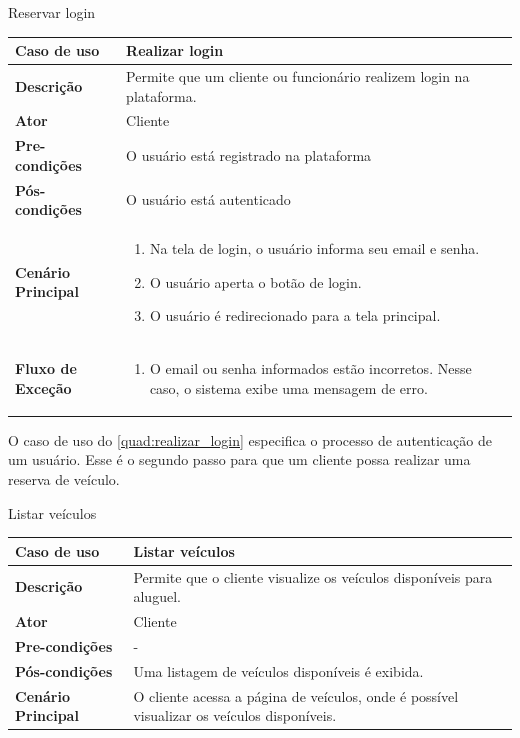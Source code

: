 \begin{quadro}[H]
    \centering
    \caption{Reservar login}
    \label{quad:realizar_login}
    \begin{tabular}{|p{1.2in}|p{3.5in}|}
    \hline
    
    \textbf{Caso de uso} & Realizar login\\ \hline
    \textbf{Descrição} & Permite que um cliente ou funcionário realizem login na plataforma. \\ \hline
    \textbf{Ator} & Cliente \\ \hline
    \textbf{Pre-condições} & O usuário está registrado na plataforma\\ \hline
    \textbf{Pós-condições} & O usuário está autenticado\\ \hline
    \textbf{Cenário Principal} & \begin{enumerate}
        \item Na tela de login, o usuário informa seu email e senha.
        \item O usuário aperta o botão de login.
        \item O usuário é redirecionado para a tela principal.
    \end{enumerate}  \\ \hline
    \textbf{Fluxo de Exceção} & \begin{enumerate}
        \item O email ou senha informados estão incorretos. Nesse caso, o sistema exibe uma mensagem de erro.
    \end{enumerate}  \\ \hline
    \end{tabular} 
\end{quadro}

O caso de uso do \autoref{quad:realizar_login} especifica o processo de autenticação de um usuário. Esse é o segundo passo para que um cliente possa realizar uma reserva de veículo.

\begin{quadro}[H]
    \centering
    \caption{Listar veículos}
    \label{quad:listar_veiculos}
    \begin{tabular}{|p{1.2in}|p{3.5in}|}
    \hline
    
    \textbf{Caso de uso} & Listar veículos \\ \hline
    \textbf{Descrição} & Permite que o cliente visualize os veículos disponíveis para aluguel. \\ \hline
    \textbf{Ator} & Cliente \\ \hline
    \textbf{Pre-condições} & - \\ \hline
    \textbf{Pós-condições} & Uma listagem de veículos disponíveis é exibida. \\ \hline
    \textbf{Cenário Principal} & O cliente acessa a página de veículos, onde é possível visualizar os veículos disponíveis. \\ \hline
    
    \end{tabular}
\end{quadro}

